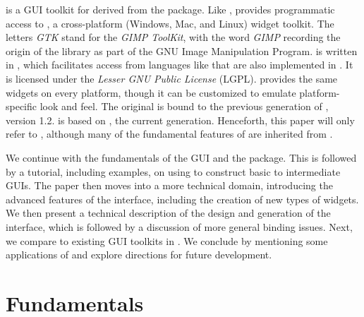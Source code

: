 \documentclass[article,shortnames]{jss}
\begin{document}
 is a GUI toolkit for  derived from the
 package.
Like ,  provides programmatic access to
, 
a cross-platform (Windows, Mac, and Linux) widget toolkit. 
The letters \emph{GTK} stand for the \emph{GIMP ToolKit}, with the
word \emph{GIMP} recording the origin of the library as part of the
GNU Image Manipulation Program.  is written in ,
which
facilitates access from languages like  that are also
implemented 
in . It is licensed under the \emph{Lesser GNU Public
License} (LGPL).
 provides the same widgets on every platform, though it can
be customized to emulate platform-specific look and feel. The original
 is bound to the previous generation of , version
1.2.  is based on , the current
generation. Henceforth, this paper will only refer to ,
although many of the fundamental features of  are inherited
from .

We continue with the fundamentals of the  GUI and the
 package. This is followed by a tutorial, including
examples, on using  to construct basic to intermediate
GUIs. The paper then moves into a more technical domain, introducing
the advanced features of the interface, including the creation of new
types of widgets. We then present a technical description of the
design and generation of the interface, which is followed by a
discussion of more general binding issues.  Next, we compare
 to existing GUI toolkits in .  We conclude by
mentioning some applications of  and explore directions for
future development.

\section{Fundamentals}
\end{document}
